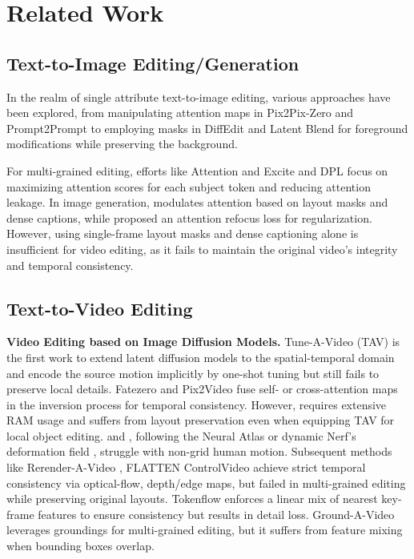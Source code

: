 \section{Related Work}
\subsection{Text-to-Image Editing/Generation}

In the realm of single attribute text-to-image editing, various approaches have been explored, from manipulating attention maps in Pix2Pix-Zero \citep{parmar2023zero} and Prompt2Prompt \citep{hertz2022prompt} to employing masks in DiffEdit \citep{couairon2023diffedit} and Latent Blend \citep{avrahami2022blended,avrahami2023blended} for foreground modifications while preserving the background. 

For multi-grained editing, efforts like Attention and Excite \citep{chefer2023attend} and DPL \citep{wang2023dynamic} focus on maximizing attention scores for each subject token and reducing attention leakage. In image generation, \citep{densediffusion} modulates attention based on layout masks and dense captions, while \citep{phung2023grounded} proposed an attention refocus loss for regularization. However, using single-frame layout masks and dense captioning alone is insufficient for video editing, as it fails to maintain the original video’s integrity and temporal consistency.

\subsection{Text-to-Video Editing}
\textbf{Video Editing based on Image Diffusion Models.}
Tune-A-Video (TAV) \citep{wu2022tune} is the first work to extend latent diffusion models to the spatial-temporal domain and encode the source motion implicitly by one-shot tuning but still fails to preserve local details. Fatezero \citep{qi2023fatezero} and Pix2Video \citep{ceylan2023pix2video} fuse self- or cross-attention maps in the inversion process for temporal consistency. 
However, \citep{qi2023fatezero} requires extensive RAM usage and suffers from layout preservation even when equipping TAV for local object editing. 
\citep{chai2023stablevideo} and \citep{ouyang2023codef}, following the Neural Atlas \citep{kasten2021layered} or dynamic Nerf's deformation field \citep{pumarola2021d}, struggle with non-grid human motion. 
Subsequent methods like Rerender-A-Video \citep{yang2023rerender}, FLATTEN \citep{cong2023flatten} ControlVideo \citep{zhang2023controlvideo} achieve strict temporal consistency via optical-flow, depth/edge maps, but failed in multi-grained editing while preserving original layouts. Tokenflow \citep{geyer2023tokenflow} enforces a linear mix of nearest key-frame features to ensure consistency but results in detail loss. Ground-A-Video \citep{jeong2023ground} leverages groundings for multi-grained editing, but it suffers from feature mixing when bounding boxes overlap.

